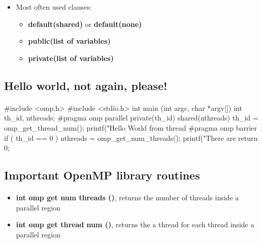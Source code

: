 \documentclass[%
twoside,                 %
final,                   %
10pt]{article}
\begin{document}
{\begin{itemize}
\item Most often used clauses:
\begin{itemize}

 \item \textbf{default(shared)} or \textbf{default(none)}

 \item \textbf{public(list of variables)}

 \item \textbf{private(list of variables)}
\end{itemize}

\noindent
\end{itemize}

\noindent



\subsection{Hello world, not again, please!}

\paragraph{}
\bcppcod
#include <omp.h>
#include <stdio.h>
int main (int argc, char *argv[])
{
int th_id, nthreads;
#pragma omp parallel private(th_id) shared(nthreads)
{
th_id = omp_get_thread_num();
printf("Hello World from thread %
#pragma omp barrier
if ( th_id == 0 ) {
nthreads = omp_get_num_threads();
printf("There are %
}
}
return 0;
}
\ecppcod



\subsection{Important OpenMP library routines}

\paragraph{}

\begin{itemize}
\item \textbf{int omp get num threads ()}, returns the number of threads inside a parallel region

\item \textbf{int omp get thread num ()},  returns the  a thread for each thread inside a parallel region


\end{itemize}}
\end{document}
